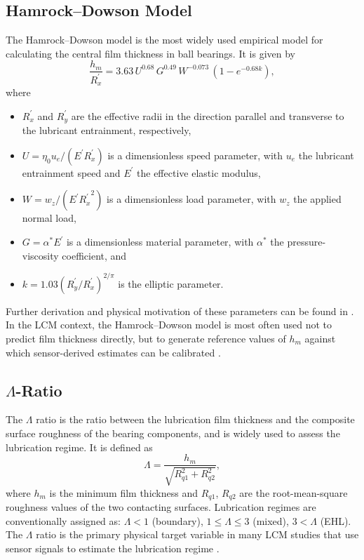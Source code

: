 \subsection{Hamrock--Dowson Model}
\label{subsec:hamrock_dowson}
The Hamrock--Dowson model is the most widely used empirical model for calculating the central film thickness in ball bearings. It is given by
\begin{equation}
    \frac{h_m}{R_{x}^{'}} = 3.63\,U^{0.68}\,G^{0.49}\,W^{-0.073}\,(1-e^{-0.68k}),
\end{equation}
where
\begin{itemize}
    \item $R^{'}_{x}$ and $R^{'}_{y}$ are the effective radii in the direction parallel and transverse to the lubricant entrainment, respectively,
    \item $U=\eta_0 u_e/(E^{'}R^{'}_{x})$ is a dimensionless speed parameter, with $u_e$ the lubricant entrainment speed and $E^{'}$ the effective elastic modulus,
    \item $W=w_z/(E^{'}{R^{'}_{x}}^{2})$ is a dimensionless load parameter, with $w_z$ the applied normal load,
    \item $G=\alpha^*E^{'}$ is a dimensionless material parameter, with $\alpha^*$ the pressure-viscosity coefficient, and
    \item $k=1.03(R_{y}^{'}/R_{x}^{'})^{2/\pi}$ is the elliptic parameter.
\end{itemize}
Further derivation and physical motivation of these parameters can be found in \cite{cen_ehl_2021,hansen_new_2021,maruyama_lubrication_2019,noauthor_elasto-hydrodynamic_1977}. In the LCM context, the Hamrock--Dowson model is most often used not to predict film thickness directly, but to generate reference values of $h_m$ against which sensor-derived estimates can be calibrated \cite{jakobsen_detecting_2023,hou_-situ_2025,jablonka_quantitative_2018}.

\subsection{$\Lambda$-Ratio}
\label{subsec:lambda}
The $\Lambda$ ratio is the ratio between the lubrication film thickness and the composite surface roughness of the bearing components, and is widely used to assess the lubrication regime. It is defined as
\begin{equation}
\Lambda = \frac{h_{m}}{\sqrt{R_{q1}^2 + R_{q2}^2}},
\end{equation}
where $h_{m}$ is the minimum film thickness and $R_{q1}$, $R_{q2}$ are the root-mean-square roughness values of the two contacting surfaces. Lubrication regimes are conventionally assigned as: $\Lambda < 1$ (boundary), $1 \leq \Lambda \leq 3$ (mixed), $3 < \Lambda$ (EHL). The $\Lambda$ ratio is the primary physical target variable in many LCM studies that use sensor signals to estimate the lubrication regime \cite{jakobsen_detecting_2023,hou_-situ_2025,cornel_condition_2021}.

